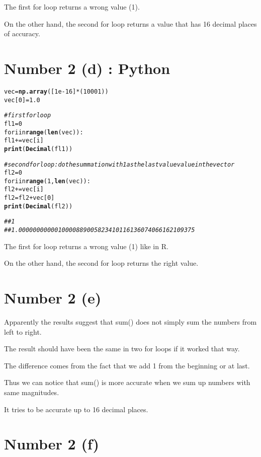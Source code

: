 \documentclass[english]{article}\usepackage[]{graphicx}\usepackage[]{color}
\makeatletter
\newcommand{\hlcom}[1]{\textcolor[rgb]{0.678,0.584,0.686}{\textit{#1}}}%
\newcommand{\hlkwd}[1]{\textcolor[rgb]{0.737,0.353,0.396}{\textbf{#1}}}%
\newenvironment{kframe}{%
 \def\at@end@of@kframe{}%
 \ifinner\ifhmode%
  \def\at@end@of@kframe{\end{minipage}}%
  \begin{minipage}{\columnwidth}%
 \fi\fi%
 \def\FrameCommand##1{\hskip\@totalleftmargin \hskip-\fboxsep
 \colorbox{shadecolor}{##1}\hskip-\fboxsep
     \hskip-\linewidth \hskip-\@totalleftmargin \hskip\columnwidth}%
 \MakeFramed {\advance\hsize-\width
   \@totalleftmargin\z@ \linewidth\hsize
   \@setminipage}}%
 {\par\unskip\endMakeFramed%
 \at@end@of@kframe}
\newenvironment{knitrout}{}{} %
\makeatother
\begin{document}
The first for loop returns a wrong value (1).

On the other hand, the second for loop returns a value that has 16
decimal places of accuracy.


\section*{Number 2 (d) : Python}

\begin{knitrout}
\color{fgcolor}\begin{kframe}
\begin{alltt}
vec = \hlkwd{np.array}([1e-16]*(10001)) 
vec[0] = 1.0

\hlcom{#first for loop}
fl1 = 0 
for i in \hlkwd{range}(\hlkwd{len}(vec)):
  fl1 += vec[i] 
\hlkwd{print}(\hlkwd{Decimal}(fl1))

\hlcom{# second for loop: do the summation with 1 as the last value value in the vector}
fl2 = 0 
for i in \hlkwd{range}(1, \hlkwd{len}(vec)):
  fl2 += vec[i] 
fl2 = fl2 + vec[0] 
\hlkwd{print}(\hlkwd{Decimal}(fl2))

\hlcom{## 1 }
\hlcom{## 1.0000000000010000889005823410116136074066162109375}
\end{alltt}
\end{kframe}
\end{knitrout}

The first for loop returns a wrong value (1) like in R.

On the other hand, the second for loop returns the right value.


\section*{Number 2 (e)}

Apparently the results suggest that sum() does not simply sum the
numbers from left to right.

The result should have been the same in two for loops if it worked
that way.

The difference comes from the fact that we add 1 from the beginning
or at last.

Thus we can notice that sum() is more accurate when we sum up numbers
with same magnitudes.

It tries to be accurate up to 16 decimal places.


\section*{Number 2 (f)}
\end{document}

